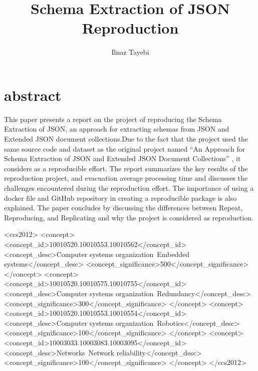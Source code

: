 \documentclass[sigconf]{acmart}
\begin{document}
\twocolumn
\title{Schema Extraction of JSON Reproduction}
\author{Ilnaz Tayebi}
\maketitle
\section*{abstract}
This paper presents a report on the project of reproducing the Schema Extraction of JSON, an approach for extracting schemas from JSON and Extended JSON document collections.Due to the fact that the project used the same source code \cite{SONSchemaDiscovery2013} and dataset as the original project named ``An Approach for Schema Extraction of JSON and Extended JSON Document Collections'' \cite{8424731}, it considers as a reproducible effort. The report summarizes the key results of the reproduction project, and evacuation average processing time and discusses the challenges encountered during the reproduction effort. The importance of using a docker file and GitHub repository in creating a reproducible package is also explained. The paper concludes by discussing the differences between Repeat, Reproducing, and Replicating and why the project is considered as reproduction.
\begin{CCSXML}
<ccs2012>
 <concept>
  <concept_id>10010520.10010553.10010562</concept_id>
  <concept_desc>Computer systems organization~Embedded systems</concept_desc>
  <concept_significance>500</concept_significance>
 </concept>
 <concept>
  <concept_id>10010520.10010575.10010755</concept_id>
  <concept_desc>Computer systems organization~Redundancy</concept_desc>
  <concept_significance>300</concept_significance>
 </concept>
 <concept>
  <concept_id>10010520.10010553.10010554</concept_id>
  <concept_desc>Computer systems organization~Robotics</concept_desc>
  <concept_significance>100</concept_significance>
 </concept>
 <concept>
  <concept_id>10003033.10003083.10003095</concept_id>
  <concept_desc>Networks~Network reliability</concept_desc>
  <concept_significance>100</concept_significance>
 </concept>
</ccs2012>
\end{CCSXML}

\end{document}
